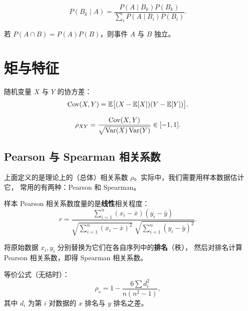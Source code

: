 \begin{theorem}[贝叶斯公式]
\begin{equation}
    P(B_k \mid A) = \frac{P(A \mid B_k) P(B_k)}{\sum_{i} P(A \mid B_i) P(B_i)}.
\end{equation}
\end{theorem}

\begin{definition}[独立性]
若 $P(A \cap B) = P(A)P(B)$，则事件 $A$ 与 $B$ 独立。
\end{definition}

\section{矩与特征}

\begin{definition}[协方差]
随机变量 $X$ 与 $Y$ 的协方差：
\begin{equation}
    \mathrm{Cov}(X, Y) = \mathbb{E}\big[(X - \mathbb{E}[X])(Y - \mathbb{E}[Y])\big].
\end{equation}
\end{definition}

\begin{definition}[相关系数]
\begin{equation}
    \rho_{XY} = \frac{\mathrm{Cov}(X, Y)}{\sqrt{\mathrm{Var}(X)\,\mathrm{Var}(Y)}} \in [-1, 1].
\end{equation}
\end{definition}

\subsection{Pearson 与 Spearman 相关系数}

上面定义的是理论上的（总体）相关系数 $\rho$。实际中，我们需要用样本数据估计它，
常用的有两种：Pearson 和 Spearman。

\begin{definition}
样本 Pearson 相关系数度量的是\textbf{线性}相关程度：
\begin{equation}
    r = \frac{\sum_{i=1}^{n}(x_i - \bar{x})(y_i - \bar{y})}
             {\sqrt{\sum_{i=1}^{n}(x_i - \bar{x})^2}\;
              \sqrt{\sum_{i=1}^{n}(y_i - \bar{y})^2}}.
\end{equation}
\end{definition}

\begin{definition}
将原始数据 $x_i, y_i$ 分别替换为它们在各自序列中的\textbf{排名}（秩），
然后对排名计算 Pearson 相关系数，即得 Spearman 相关系数。

等价公式（无结时）：
\begin{equation}
    \rho_s = 1 - \frac{6\sum d_i^2}{n(n^2-1)},
\end{equation}
其中 $d_i$ 为第 $i$ 对数据的 $x$ 排名与 $y$ 排名之差。
\end{definition}

